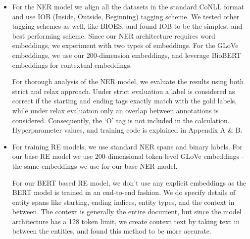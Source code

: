 \documentclass[letterpaper]{article}
\begin{document}
\begin{itemize}
\begin{table}[ht]
\centering
{}
\caption{Training and inference time (in seconds) taken by the NER model on each dataset using different token embeddings with respect to overal performance on test set. Epoch count was kept constant for all datasets while training. The experiment was performed on an 8-core machine having 64gb memory.}
\label{tab:time_stats}
\end{table}
    
    \item For the NER model we align all the datasets in the standard CoNLL format and use IOB (Inside, Outside, Beginning) tagging scheme. We tested other tagging schemes as well, like BIOES, and found IOB to be the simplest and best performing scheme. Since our NER architecture requires word embeddings, we experiment with two types of embeddings. For the GLoVe embeddings, we use our 200-dimension embeddings, and leverage BioBERT embeddings for contextual embeddings.
    
    For thorough analysis of the NER model, we evaluate the results using both strict and relax approach. Under strict evaluation a label is considered as correct if the starting and ending tags exactly match with the gold labels, while under relax evaluation only an overlap between annotations is considered. Consequently, the ‘O’ tag is not included in the calculation. Hyperparameter values, and training code is explained in Appendix A \& B.
    
    \item For training RE models, we use standard NER spans and binary labels. For our base RE model we use 200-dimensional token-level GLoVe embeddings - the same embeddings we use for our base NER model.
    
    For our BERT based RE model, we don't use any explicit embeddings as the BERT model is trained in an end-to-end fashion. We do specify details of entity spans like starting, ending indices, entity types, and the context in between. The context is generally the entire document, but since the model architecture has a 128 token limit, we create context text by taking text in between the entities, and found this method to be more accurate.
    

\end{itemize}
\end{document}
